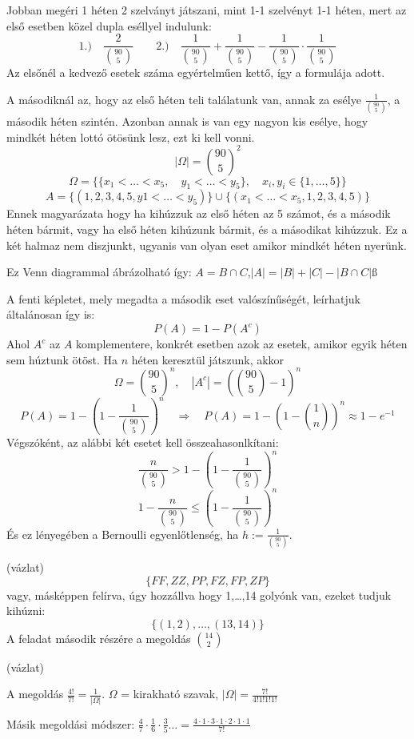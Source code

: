 \documentclass[a4paper,11.5pt]{article}
\begin{document}
	\begin{task}
		Jobban megéri 1 héten 2 szelványt játszani, mint 1-1 szelvényt 1-1 héten, mert az első esetben közel dupla eséllyel indulunk:
		\[ 1.) \quad \frac{2}{\binom{90}{5}}\qquad 2.)\quad  \frac{1}{\binom{90}{5}}+\frac{1}{\binom{90}{5}}-\frac{1}{\binom{90}{5}}\cdot\frac{1}{\binom{90}{5}} \]
		Az elsőnél a kedvező esetek száma egyértelműen kettő, így a formulája adott.
		
		A másodiknál az, hogy az első héten teli találatunk van, annak za esélye $\frac{1}{\binom{90}{5}}$, a második héten szintén. Azonban annak is van egy nagyon kis esélye, hogy mindkét héten lottó ötösünk lesz, ezt ki kell vonni.
		\[ |\varOmega|=\binom{90}{5}^2 \]
		\[ \varOmega=\{ \{x_1<\ldots<x_5,\quad y_1<\ldots<y_5\}, \quad x_i,y_i\in\{1,\ldots,5 \}\} \]
		\[ A=\{ (1,2,3,4,5,y1<\ldots<y_5) \} \cup\{ (x_1<\ldots<x_5,1,2,3,4,5) \} \]
		Ennek magyarázata hogy ha kihúzzuk az első héten az 5 számot, és a második héten bármit, vagy ha első héten kihúzunk bármit, és a másodikat kihúzzuk. Ez a két halmaz nem diszjunkt, ugyanis van olyan eset amikor mindkét héten nyerünk.
		
		Ez Venn diagrammal ábrázolható így: $A=B\cap C$,\quad $|A|=|B|+|C|-|B\cap C|ß$
		
		A fenti képletet, mely megadta a második eset valószínűségét, leírhatjuk általánosan így is:
		\[ P(A)=1-P(A^c) \]
		Ahol $A^c$ az $A$ komplementere, konkrét esetben azok az esetek, amikor egyik héten sem húztunk ötöst. Ha $n$ héten keresztül játszunk, akkor
		\[ \varOmega=\binom{90}{5}^n, \quad |A^c|=\left(\binom{90}{5}-1\right)^n \]
		\[ P(A)=1-\left(1-\frac{1}{\binom{90}{5}}\right)^n\quad \Rightarrow\quad P(A)=1-\left(1-\binom{1}{n}\right)^n\approx1-e^{-1} \]
		Végszóként, az alábbi két esetet kell összeahasonlkítani:
		\[ \frac{n}{\binom{90}{5}}> 1-\left(1-\frac{1}{\binom{90}{5}}\right)^n \] 
		\[ 1-\frac{n}{\binom{90}{5}}\leq \left(1-\frac{1}{\binom{90}{5}}\right)^n \] 
		És ez lényegében a Bernoulli egyenlőtlenség, ha $h:=\frac{1}{\binom{90}{5}}$.
	\end{task}
	\begin{task}
		(vázlat) 
		\[ \{FF, ZZ, PP, FZ, FP, ZP\} \]
		vagy, másképpen felírva, úgy hozzállva hogy 1,\ldots,14 golyónk van, ezeket tudjuk kihúzni:
		\[ \{(1,2),\ldots,(13,14) \} \]
		A feladat második részére a megoldás $\binom{14}{2}$
	\end{task}
	\begin{task}
		(vázlat)
		
		A megoldás $\frac{4!}{7!}=\frac{1}{|\varOmega|}$. $\varOmega$ = kirakható szavak, $|\varOmega|=\frac{7!}{4!1!1!1!}$
		
		Másik megoldási módszer: $\frac{4}{7}\cdot\frac{1}{6}\cdot\frac{3}{5}\ldots=\frac{4\cdot1\cdot3\cdot1\cdot2\cdot1\cdot1}{7!}$
	\end{task}
\end{document}
